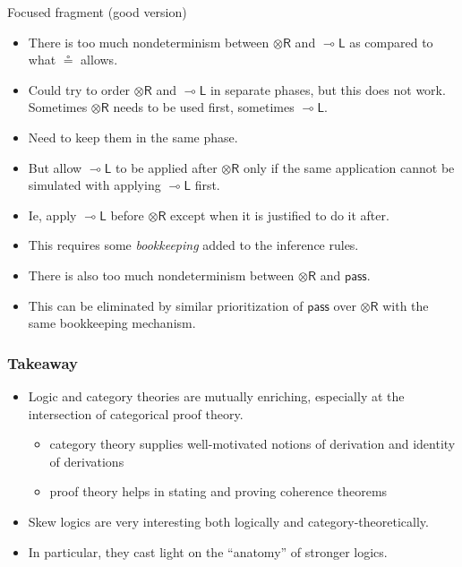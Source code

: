 \documentclass[10pt,t]{beamer}
\newcommand{\ot}{\otimes}
\newcommand{\uf}{\mathsf{pass}}
\newcommand{\otR}{\ot\mathsf{R}}
\newcommand{\loL}{{\lo}\mathsf{L}}
\newcommand{\lo}{\multimap}
\begin{document}
\begin{frame}{Focused fragment (good version)}

\begin{itemize}

\item There is too much nondeterminism between $\otR$ and $\loL$ as
  compared to what $\circeq$ allows.

\bigskip

\item Could try to order $\otR$ and $\loL$ in separate phases,
  but this does not work. Sometimes $\otR$ needs to be used first,
  sometimes $\loL$.

\bigskip

\item Need to keep them in the same phase.

\item But allow $\loL$ to be applied after $\otR$ only if the same
  application cannot be simulated with applying $\loL$ first.

\item Ie, apply $\loL$ before $\otR$ except when it is justified to do
  it after.

\item This requires some \emph{bookkeeping} added to the inference
  rules.

\bigskip 

\item There is also too much nondeterminism between $\otR$ and $\uf$.

\item This can be eliminated by similar prioritization of $\uf$ over
  $\otR$ with the same bookkeeping mechanism.

\end{itemize}


\end{frame}


\begin{frame}

\frametitle{Takeaway}

\begin{itemize}

\item Logic and category theories are mutually enriching, especially at the
  intersection of categorical proof theory.

\begin{itemize}
\item category theory supplies well-motivated notions of derivation
  and identity of derivations
\item proof theory helps in stating and proving coherence theorems
\end{itemize}

\bigskip

\item Skew logics are very interesting both logically
  and category-theoretically. 

\item In particular, they cast light on the ``anatomy'' of stronger
  logics.

\end{itemize}

\end{frame}
\end{document}
